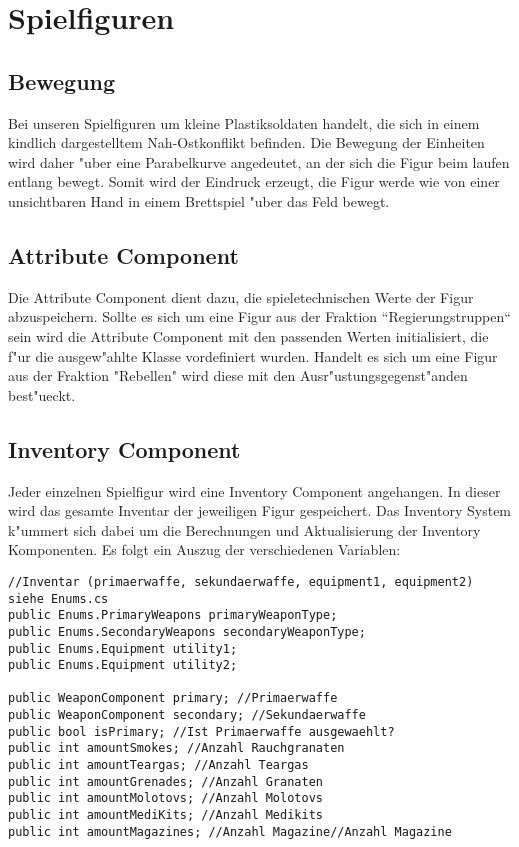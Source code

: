 \chapter{Spielfiguren}

\section{Bewegung}
Bei unseren Spielfiguren um kleine Plastiksoldaten handelt, die sich in einem kindlich dargestelltem Nah-Ostkonflikt befinden. Die Bewegung der Einheiten wird daher "uber eine Parabelkurve angedeutet, an der sich die Figur beim laufen entlang bewegt. Somit wird der Eindruck erzeugt, die Figur werde wie von einer unsichtbaren Hand in einem Brettspiel "uber das Feld bewegt.

\section{Attribute Component}
Die Attribute Component dient dazu, die spieletechnischen Werte der Figur abzuspeichern. Sollte es sich um eine Figur aus der Fraktion ``Regierungstruppen`` sein wird die Attribute Component mit den passenden Werten initialisiert, die f"ur die ausgew"ahlte Klasse vordefiniert wurden. Handelt es sich um eine Figur aus der Fraktion "Rebellen" wird diese mit den Ausr"ustungsgegenst"anden best"ueckt. 


\section{Inventory Component}
Jeder einzelnen Spielfigur wird eine Inventory Component angehangen. In dieser wird das gesamte Inventar der jeweiligen Figur gespeichert. Das Inventory System k"ummert sich dabei um die Berechnungen und Aktualisierung der Inventory Komponenten.\newline
Es folgt ein Auszug der verschiedenen Variablen:\newline

\begin{lstlisting}[breaklines = true]
//Inventar (primaerwaffe, sekundaerwaffe, equipment1, equipment2) siehe Enums.cs    
public Enums.PrimaryWeapons primaryWeaponType;
public Enums.SecondaryWeapons secondaryWeaponType;
public Enums.Equipment utility1;
public Enums.Equipment utility2;

public WeaponComponent primary; //Primaerwaffe
public WeaponComponent secondary; //Sekundaerwaffe
public bool isPrimary; //Ist Primaerwaffe ausgewaehlt? 
public int amountSmokes; //Anzahl Rauchgranaten
public int amountTeargas; //Anzahl Teargas
public int amountGrenades; //Anzahl Granaten
public int amountMolotovs; //Anzahl Molotovs
public int amountMediKits; //Anzahl Medikits
public int amountMagazines; //Anzahl Magazine//Anzahl Magazine
\end{lstlisting}

